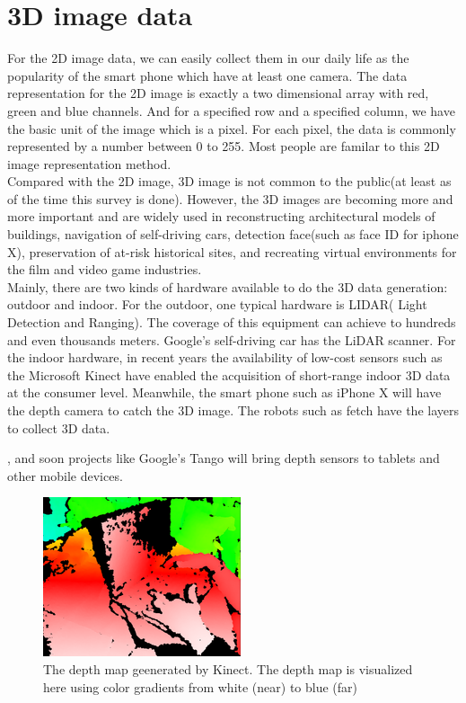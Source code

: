 \documentclass[a4paper,12pt]{article}
\begin{document}
\chapter{3D image data}
For the 2D image data, we can easily collect them in our daily life as the popularity of the smart phone which have at least one camera. The data representation for the 2D image is exactly a two dimensional array with red, green and blue channels. And for a specified row and a specified column, we have the basic unit of the image which is a pixel. For each pixel, the data is commonly represented by a number between 0 to 255. Most people are familar to this 2D image representation method.\\
Compared with the 2D image, 3D image is not common to the public(at least as of the time this survey is done). However, the 3D images are becoming more and more important and are widely used in reconstructing architectural models of buildings, navigation of self-driving cars, detection face(such as face ID for iphone X), preservation of at-risk historical sites, and recreating virtual environments for the film and video game industries.\\
Mainly, there are two kinds of hardware available to do the 3D data generation: outdoor and indoor. For the outdoor, one typical hardware is LIDAR( Light Detection and Ranging). The coverage of this equipment can achieve to hundreds and even thousands meters. Google’s self-driving car has the LiDAR scanner. For the  indoor hardware, in recent years the availability of low-cost sensors such as the Microsoft Kinect
have enabled the acquisition of short-range indoor 3D data at the consumer level. Meanwhile, the smart phone such as iPhone X will have the depth camera to catch the 3D image. The robots such as fetch have the layers to collect 3D data.


, and soon projects like Google’s Tango will bring depth sensors to tablets
and other mobile devices.


\begin{figure}[H]
  \begin{center}
      \includegraphics[scale=0.6]{Kinect2-deepmap.png}
\end{center}
\caption{The depth map geenerated by Kinect. The depth map is visualized here using color gradients from white (near) to blue (far)\cite{kinect}}
 \label{fig:kinect}
 \end{figure}
 
\end{document}
